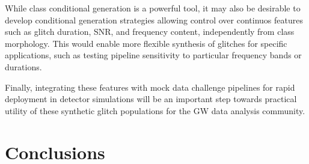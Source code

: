 \documentclass[reprint,nofootinbib,amsmath,amssymb,aps,floatfix]{revtex4-2}
\begin{document}
While class conditional generation is a powerful tool, it may also be desirable to develop conditional generation strategies allowing control over continuos features such as glitch duration, SNR, and frequency content, independently from class morphology.
This would enable more flexible synthesis of glitches for specific applications, such as testing pipeline sensitivity to particular frequency bands or durations.

Finally, integrating these features with mock data challenge pipelines for rapid deployment in detector simulations will be an important step towards practical utility of these synthetic glitch populations for the GW data analysis community.








\section{Conclusions}
\end{document}
